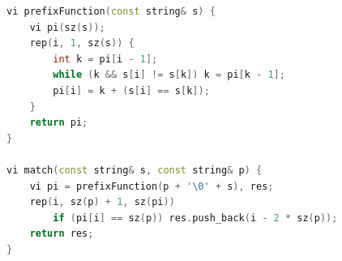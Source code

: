\begin{lstlisting}[language=C++]
vi prefixFunction(const string& s) {
	vi pi(sz(s));
	rep(i, 1, sz(s)) {
		int k = pi[i - 1];
		while (k && s[i] != s[k]) k = pi[k - 1];
		pi[i] = k + (s[i] == s[k]);
	}
	return pi;
}

vi match(const string& s, const string& p) {
	vi pi = prefixFunction(p + '\0' + s), res;
	rep(i, sz(p) + 1, sz(pi))
		if (pi[i] == sz(p)) res.push_back(i - 2 * sz(p));
	return res;
}
\end{lstlisting}
